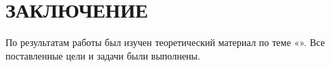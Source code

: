 \chapter{ЗАКЛЮЧЕНИЕ}
\vspace{14pt}

По результатам работы был изучен теоретический материал по теме «\workName». Все поставленные цели и задачи были выполнены.